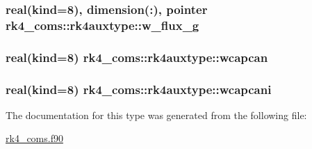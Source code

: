 \subsubsection[{w\+\_\+flux\+\_\+g}]{\setlength{\rightskip}{0pt plus 5cm}real(kind=8), dimension(\+:), pointer rk4\+\_\+coms\+::rk4auxtype\+::w\+\_\+flux\+\_\+g}\label{structrk4__coms_1_1rk4auxtype_a35a7768804c49946386dc93198567136}
\hypertarget{structrk4__coms_1_1rk4auxtype_aaf2a25af6a8bc658149b4cce183ebdfd}{}
\subsubsection[{wcapcan}]{\setlength{\rightskip}{0pt plus 5cm}real(kind=8) rk4\+\_\+coms\+::rk4auxtype\+::wcapcan}\label{structrk4__coms_1_1rk4auxtype_aaf2a25af6a8bc658149b4cce183ebdfd}
\hypertarget{structrk4__coms_1_1rk4auxtype_af38a4e719b1ba86c3cfd3bb54942de0e}{}
\subsubsection[{wcapcani}]{\setlength{\rightskip}{0pt plus 5cm}real(kind=8) rk4\+\_\+coms\+::rk4auxtype\+::wcapcani}\label{structrk4__coms_1_1rk4auxtype_af38a4e719b1ba86c3cfd3bb54942de0e}


The documentation for this type was generated from the following file\+:\begin{DoxyCompactItemize}
\item 
\hyperlink{rk4__coms_8f90}{rk4\+\_\+coms.\+f90}\end{DoxyCompactItemize}

